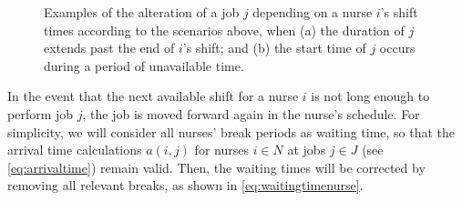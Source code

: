 \documentclass[a4paper,11pt,authoryear]{elsarticle}
\begin{document}
\begin{figure}[h!]
	\centering	
	\begin{subfigure}[h]{\textwidth}
		\centering
		
		\vspace{-2mm}\caption{}
		\label{fig:itemsinfeas}
		\vspace{2mm}
	\end{subfigure}
	\begin{subfigure}[h]{\textwidth}
		\centering
		
		\vspace{-2mm}\caption{}
		\label{fig:itemsfeas}
	\end{subfigure}
	\caption{Examples of the alteration of a job $j$ depending on a nurse $i$'s shift times according to the scenarios above, when (a) the duration of $j$ extends past the end of $i$'s shift; and (b) the start time of $j$ occurs during a period of unavailable time.}
	\label{fig:itemsaligned}
\end{figure}
\noindent In the event that the next available shift for a nurse $i$ is not long enough to perform job $j$, the job is moved forward again in the nurse's schedule. For simplicity, we will consider all nurses' break periods as waiting time, so that the arrival time calculations $a(i,j)$ for nurses $i \in N$ at jobs $j \in J$ (see \eqref{eq:arrivaltime}) remain valid. Then, the waiting times will be corrected by removing all relevant breaks, as shown in \eqref{eq:waitingtimenurse}.


\end{document}
